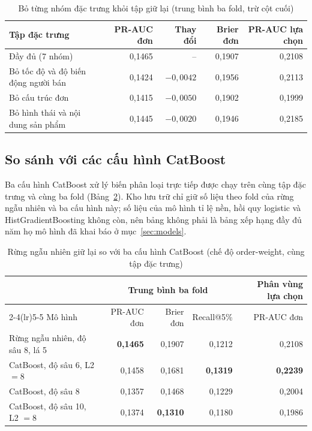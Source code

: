 \begin{table}[htbp]\centering\small
\caption{Bỏ từng nhóm đặc trưng khỏi tập giữ lại (trung bình ba fold, trừ cột cuối)}\label{tab:res-loo}
\begin{tabular}{p{5.6cm}rrrr}
\toprule
Tập đặc trưng & PR-AUC đơn & Thay đổi & Brier đơn & PR-AUC lựa chọn \\
\midrule
Đầy đủ (7 nhóm) & 0,1465 & -- & 0,1907 & 0,2108 \\
Bỏ tốc độ và độ biến động người bán & 0,1424 & $-0{,}0042$ & 0,1956 & 0,2113 \\
Bỏ cấu trúc đơn & 0,1415 & $-0{,}0050$ & 0,1902 & 0,1999 \\
Bỏ hình thái và nội dung sản phẩm & 0,1445 & $-0{,}0020$ & 0,1946 & 0,2185 \\
\bottomrule
\end{tabular}
\end{table}

\subsection{So sánh với các cấu hình CatBoost}\label{subsec:tab-catboost}

Ba cấu hình CatBoost xử lý biến phân loại trực tiếp được chạy trên cùng tập đặc trưng và cùng ba fold (Bảng~\ref{tab:res-catboost}). Kho lưu trữ chỉ giữ số liệu theo fold của rừng ngẫu nhiên và ba cấu hình này; số liệu của mô hình tỉ lệ nền, hồi quy logistic và HistGradientBoosting không còn, nên bảng không phải là bảng xếp hạng đầy đủ năm họ mô hình đã khai báo ở mục~\ref{sec:models}.

\begin{table}[htbp]\centering\small
\caption{Rừng ngẫu nhiên giữ lại so với ba cấu hình CatBoost (chế độ order-weight, cùng tập đặc trưng)}\label{tab:res-catboost}
\begin{tabular}{lrrrr}
\toprule
& \multicolumn{3}{c}{Trung bình ba fold} & Phân vùng lựa chọn \\
\cmidrule(lr){2-4}\cmidrule(lr){5-5}
Mô hình & PR-AUC đơn & Brier đơn & Recall@5\% & PR-AUC đơn \\
\midrule
Rừng ngẫu nhiên, độ sâu 8, lá 5 & \textbf{0,1465} & 0,1907 & 0,1212 & 0,2108 \\
CatBoost, độ sâu 6, L2 $=8$ & 0,1458 & 0,1681 & \textbf{0,1319} & \textbf{0,2239} \\
CatBoost, độ sâu 8 & 0,1357 & 0,1468 & 0,1229 & 0,2004 \\
CatBoost, độ sâu 10, L2 $=8$ & 0,1374 & \textbf{0,1310} & 0,1180 & 0,1986 \\
\bottomrule
\end{tabular}
\end{table}

